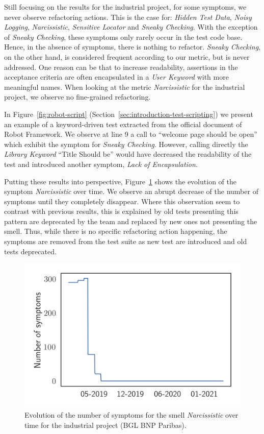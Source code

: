 Still focusing on the results for the industrial project, for some symptoms, we never observe refactoring actions. This is the case for: \emph{Hidden Test Data}, \emph{Noisy Logging}, \emph{Narcissistic}, \emph{Sensitive Locator} and \emph{Sneaky Checking}. With the exception of \emph{Sneaky Checking}, these symptoms only rarely occur in the test code base. Hence, in the absence of symptoms, there is nothing to refactor. \emph{Sneaky Checking}, on the other hand, is considered frequent according to our metric, but is never addressed. One reason can be that to increase readability, assertions in the acceptance criteria are often encapsulated in a \emph{User Keyword} with more meaningful names. When looking at the metric \emph{Narcissistic} for the industrial project, we observe no fine-grained refactoring. 

In Figure~\ref{fig:robot-script} (Section~\ref{sec:introduction-test-scripting}) we present an example of a keyword-driven test extracted from the official document of Robot Framework. We observe at line 9 a call to ``welcome page should be open'' which exhibit the symptom for \emph{Sneaky Checking}. However, calling directly the \emph{Library Keyword} ``Title Should be'' would have decreased the readability of the test and introduced another symptom, \emph{Lack of Encapsulation}.

Putting these results into perspective, Figure~\ref{fig:evolution-bgl-narcissistic} shows the evolution of the symptom \emph{Narcissistic} over time. We observe an abrupt decrease of the number of symptoms until they completely disappear. Where this observation seem to contrast with previous results, this is explained by old tests presenting this pattern are deprecated by the team and replaced by new ones not presenting the smell. Thus, while there is no specific refactoring action happening, the symptoms are removed from the test suite as new test are introduced and old tests deprecated. 

\begin{figure}
\centering
\includegraphics[width=0.5\linewidth]{figures/smells/smell-raw-evolution-bgl-narcissistic.png}
\caption{Evolution of the number of symptoms for the smell \emph{Narcissistic} over time for the industrial project (BGL BNP Paribas).}  
\label{fig:evolution-bgl-narcissistic}
\end{figure} 

